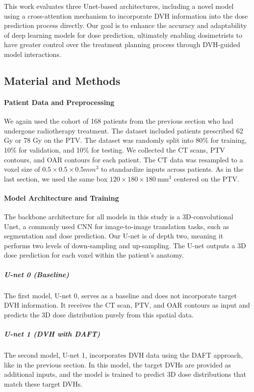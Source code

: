 This work evaluates three Unet-based architectures, including a novel model using a cross-attention mechanism to incorporate DVH information into the dose prediction process directly.
Our goal is to enhance the accuracy and adaptability of deep learning models for dose prediction, ultimately enabling dosimetrists to have greater control over the treatment planning process through DVH-guided model interactions.

\subsection{Material and Methods}
\paragraph{Patient Data and Preprocessing}
We again used the cohort of 168 patients from the previous section who had undergone radiotherapy treatment.
The dataset included patients prescribed 62 Gy or 78 Gy on the PTV.
The dataset was randomly split into 80\% for training, 10\% for validation, and 10\% for testing.
We collected the CT scans, PTV contours, and OAR contours for each patient.
The CT data was resampled to a voxel size of $0.5 \times 0.5 \times 0.5 \textit{mm}^3$ to standardize inputs across patients.
As in the last section, we used the same box $120 \times 180 \times 180\ \text{mm}^3$ centered on the PTV.

\paragraph{Model Architecture and Training}
The backbone architecture for all models in this study is a 3D-convolutional Unet, a commonly used CNN for image-to-image translation tasks, such as segmentation and dose prediction.
Our U-net is of depth two, meaning it performs two levels of down-sampling and up-sampling.
The U-net outputs a 3D dose prediction for each voxel within the patient's anatomy.

\subparagraph{U-net 0 (Baseline)}
The first model, U-net 0, serves as a baseline and does not incorporate target DVH information.
It receives the CT scan, PTV, and OAR contours as input and predicts the 3D dose distribution purely from this spatial data.

\subparagraph{U-net 1 (DVH with DAFT)}
The second model, U-net 1, incorporates DVH data using the DAFT approach, like in the previous section.
In this model, the target DVHs are provided as additional inputs, and the model is trained to predict 3D dose distributions that match these target DVHs.

